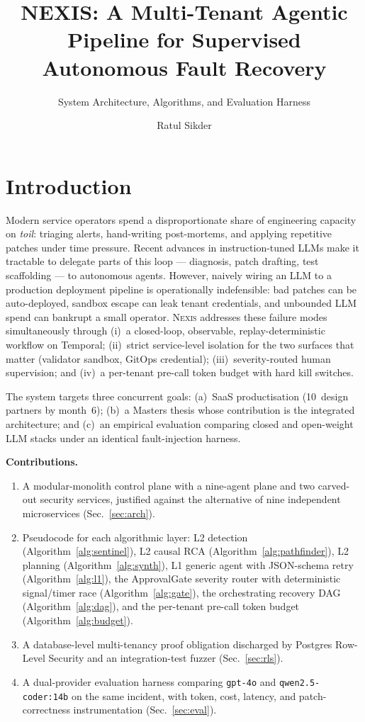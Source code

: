 \documentclass[manuscript,nonacm=true,screen=false,review=false]{acmart}
\title{NEXIS: A Multi-Tenant Agentic Pipeline for Supervised Autonomous Fault Recovery}
\subtitle{System Architecture, Algorithms, and Evaluation Harness}
\author{Ratul Sikder}
\affiliation{%
  \institution{Independent Research / Masters Project}
  \city{Dhaka}
  \country{Bangladesh}
}
\begin{document}
\maketitle

\section{Introduction}

Modern service operators spend a disproportionate share of engineering capacity on \emph{toil}: triaging alerts, hand-writing post-mortems, and applying repetitive patches under time pressure. Recent advances in instruction-tuned LLMs make it tractable to delegate parts of this loop --- diagnosis, patch drafting, test scaffolding --- to autonomous agents. However, naively wiring an LLM to a production deployment pipeline is operationally indefensible: bad patches can be auto-deployed, sandbox escape can leak tenant credentials, and unbounded LLM spend can bankrupt a small operator. \textsc{Nexis} addresses these failure modes simultaneously through (i)~a closed-loop, observable, replay-deterministic workflow on Temporal; (ii)~strict service-level isolation for the two surfaces that matter (validator sandbox, GitOps credential); (iii)~severity-routed human supervision; and (iv)~a per-tenant pre-call token budget with hard kill switches.

The system targets three concurrent goals: (a)~SaaS productisation (10~design partners by month~6); (b)~a Masters thesis whose contribution is the integrated architecture; and (c)~an empirical evaluation comparing closed and open-weight LLM stacks under an identical fault-injection harness.

\textbf{Contributions.}
\begin{enumerate}
\item A modular-monolith control plane with a nine-agent plane and two carved-out security services, justified against the alternative of nine independent microservices (Sec.~\ref{sec:arch}).
\item Pseudocode for each algorithmic layer: L2 detection (Algorithm~\ref{alg:sentinel}), L2 causal RCA (Algorithm~\ref{alg:pathfinder}), L2 planning (Algorithm~\ref{alg:synth}), L1 generic agent with JSON-schema retry (Algorithm~\ref{alg:l1}), the ApprovalGate severity router with deterministic signal/timer race (Algorithm~\ref{alg:gate}), the orchestrating recovery DAG (Algorithm~\ref{alg:dag}), and the per-tenant pre-call token budget (Algorithm~\ref{alg:budget}).
\item A database-level multi-tenancy proof obligation discharged by Postgres Row-Level Security and an integration-test fuzzer (Sec.~\ref{sec:rls}).
\item A dual-provider evaluation harness comparing \texttt{gpt-4o} and \texttt{qwen2.5-coder:14b} on the same incident, with token, cost, latency, and patch-correctness instrumentation (Sec.~\ref{sec:eval}).
\end{enumerate}
\end{document}
